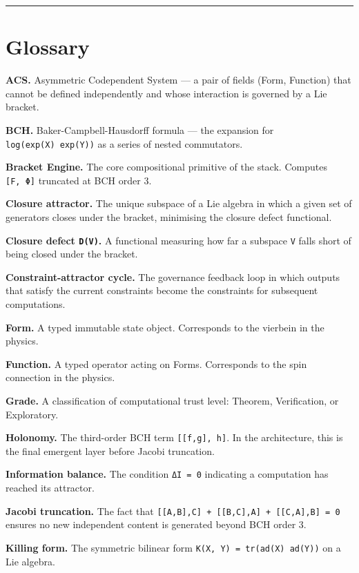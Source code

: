 \documentclass[11pt,a4paper]{article}
\begin{document}
\begin{center}\rule{0.5\linewidth}{0.5pt}\end{center}

\hypertarget{glossary}{%
\section{Glossary}\label{glossary}}

\textbf{ACS.} Asymmetric Codependent System --- a pair of fields (Form,
Function) that cannot be defined independently and whose interaction is
governed by a Lie bracket.

\textbf{BCH.} Baker-Campbell-Hausdorff formula --- the expansion for
\texttt{log(exp(X)\ exp(Y))} as a series of nested commutators.

\textbf{Bracket Engine.} The core compositional primitive of the stack.
Computes \texttt{{[}F,\ Φ{]}} truncated at BCH order 3.

\textbf{Closure attractor.} The unique subspace of a Lie algebra in
which a given set of generators closes under the bracket, minimising the
closure defect functional.

\textbf{Closure defect \texttt{D(V)}.} A functional measuring how far a
subspace \texttt{V} falls short of being closed under the bracket.

\textbf{Constraint-attractor cycle.} The governance feedback loop in
which outputs that satisfy the current constraints become the
constraints for subsequent computations.

\textbf{Form.} A typed immutable state object. Corresponds to the
vierbein in the physics.

\textbf{Function.} A typed operator acting on Forms. Corresponds to the
spin connection in the physics.

\textbf{Grade.} A classification of computational trust level: Theorem,
Verification, or Exploratory.

\textbf{Holonomy.} The third-order BCH term
\texttt{{[}{[}f,g{]},\ h{]}}. In the architecture, this is the final
emergent layer before Jacobi truncation.

\textbf{Information balance.} The condition \texttt{ΔI\ =\ 0} indicating
a computation has reached its attractor.

\textbf{Jacobi truncation.} The fact that
\texttt{{[}{[}A,B{]},C{]}\ +\ {[}{[}B,C{]},A{]}\ +\ {[}{[}C,A{]},B{]}\ =\ 0}
ensures no new independent content is generated beyond BCH order 3.

\textbf{Killing form.} The symmetric bilinear form
\texttt{K(X,\ Y)\ =\ tr(ad(X)\ ad(Y))} on a Lie algebra.
\end{document}
